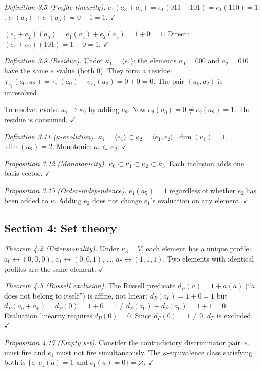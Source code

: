 \emph{Definition 3.5 (Profile linearity).}
$e_1(a_3 + a_5) = e_1(011 + 101) = e_1(110) = 1$.
$e_1(a_3) + e_1(a_5) = 0 + 1 = 1$. $\checkmark$

$(e_1 + e_2)(a_5) = e_1(a_5) + e_2(a_5) = 1 + 0 = 1$.
Direct: $(e_1 + e_2)(101) = 1 + 0 = 1$. $\checkmark$

\emph{Definition 3.9 (Residue).}
Under $\kappa_1 = \langle e_1 \rangle$: the elements
$a_0 = 000$ and $a_2 = 010$ have the same $e_1$-value
(both 0). They form a residue: $\chi_{e_1}(a_0, a_2)
= \tau_{e_1}(a_0) + \sigma_{e_1}(a_2) = 0 + 0 = 0$.
The pair $(a_0, a_2)$ is unresolved.

To resolve: evolve $\kappa_1 \to \kappa_2$ by adding
$e_2$. Now $e_2(a_0) = 0 \neq e_2(a_2) = 1$. The
residue is consumed. $\checkmark$

\emph{Definition 3.11 ($\kappa$-evolution).}
$\kappa_1 = \langle e_1 \rangle \subset
\kappa_2 = \langle e_1, e_2 \rangle$.
$\dim(\kappa_1) = 1$, $\dim(\kappa_2) = 2$.
Monotonic: $\kappa_1 \subset \kappa_2$. $\checkmark$

\emph{Proposition 3.12 (Monotonicity).}
$\kappa_0 \subset \kappa_1 \subset \kappa_2 \subset
\kappa_3$. Each inclusion adds one basis vector. $\checkmark$

\emph{Proposition 3.15 (Order-independence).}
$e_1(a_5) = 1$ regardless of whether $e_2$ has been
added to $\kappa$. Adding $e_2$ does not change $e_1$'s
evaluation on any element. $\checkmark$

\subsection{Section 4: Set theory}

\emph{Theorem 4.2 (Extensionality).}
Under $\kappa_3 = V$, each element has a unique profile:
$a_0 \leftrightarrow (0,0,0)$, $a_1 \leftrightarrow
(0,0,1)$, \ldots, $a_7 \leftrightarrow (1,1,1)$.
Two elements with identical profiles are the same element.
$\checkmark$

\emph{Theorem 4.5 (Russell exclusion).}
The Russell predicate $d_P(a) = 1 + a(a)$ (``$a$ does
not belong to itself'') is affine, not linear:
$d_P(a_0) = 1 + 0 = 1$ but $d_P(a_0 + a_0) = d_P(0)
= 1 + 0 = 1 \neq d_P(a_0) + d_P(a_0) = 1 + 1 = 0$.
Evaluation linearity requires $d_P(0) = 0$. Since
$d_P(0) = 1 \neq 0$, $d_P$ is excluded. $\checkmark$

\emph{Proposition 4.17 (Empty set).}
Consider the contradictory discriminator pair: $e_1$
must fire and $e_1$ must not fire simultaneously. The
$\kappa$-equivalence class satisfying both is
$\{a : e_1(a) = 1 \text{ and } e_1(a) = 0\} =
\varnothing$. $\checkmark$


